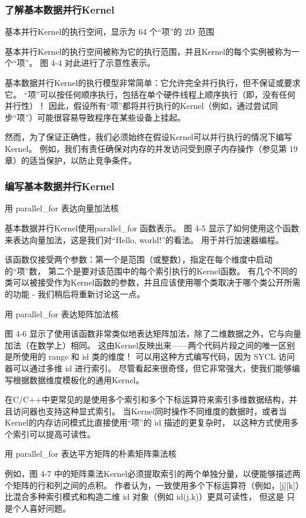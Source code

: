 \subsubsection{了解基本数据并行Kernel}
{\color{red} 基本并行Kernel的执行空间，显示为 64 个“项”的 2D 范围}

基本并行Kernel的执行空间被称为它的执行范围，并且Kernel的每个实例被称为一个“项”。 图 4-4 对此进行了示意性表示。

基本数据并行Kernel的执行模型非常简单：它允许完全并行执行，但不保证或要求它。 
“项”可以按任何顺序执行，包括在单个硬件线程上顺序执行（即，没有任何并行性）！ 
因此，假设所有“项”都将并行执行的Kernel（例如，通过尝试同步“项”）可能很容易导致程序在某些设备上挂起。

然而，为了保证正确性，我们必须始终在假设Kernel可以并行执行的情况下编写Kernel。 
例如，我们有责任确保对内存的并发访问受到原子内存操作（参见第 19 章）的适当保护，以防止竞争条件。

\subsubsection{编写基本数据并行Kernel}
{\color{red} 用 parallel\_for 表达向量加法核 }

基本数据并行Kernel使用parallel\_for 函数表示。 
图 4-5 显示了如何使用这个函数来表达向量加法，这是我们对“Hello, world!”的看法。 用于并行加速器编程。

该函数仅接受两个参数：第一个是范围（或整数），指定在每个维度中启动的“项”数，
第二个是要对该范围中的每个索引执行的Kernel函数。 
有几个不同的类可以被接受作为Kernel函数的参数，并且应该使用哪个类取决于哪个类公开所需的功能 - 我们稍后将重新讨论这一点。

{\color{red} 用 parallel\_for 表达矩阵加法核}

图 4-6 显示了使用该函数非常类似地表达矩阵加法，除了二维数据之外，它与向量加法（在数学上）相同。 
这由Kernel反映出来——两个代码片段之间的唯一区别是所使用的 range 和 id 类的维度！ 
可以用这种方式编写代码，因为 SYCL 访问器可以通过多维 id 进行索引。 
尽管看起来很奇怪，但它非常强大，使我们能够编写根据数据维度模板化的通用Kernel。

在C/C++中更常见的是使用多个索引和多个下标运算符来索引多维数据结构，并且访问器也支持这种显式索引。 
当Kernel同时操作不同维度的数据时，或者当Kernel的内存访问模式比直接使用“项”的 id 描述的更复杂时，
以这种方式使用多个索引可以提高可读性。

{\color{red} 用 parallel\_for 表达平方矩阵的朴素矩阵乘法核 }

例如，图 4-7 中的矩阵乘法Kernel必须提取索引的两个单独分量，以便能够描述两个矩阵的行和列之间的点积。 
作者认为，一致使用多个下标运算符（例如，[j][k]）比混合多种索引模式和构造二维 id 对象（例如 id(j,k)）更具可读性，
但这是 只是个人喜好问题。

